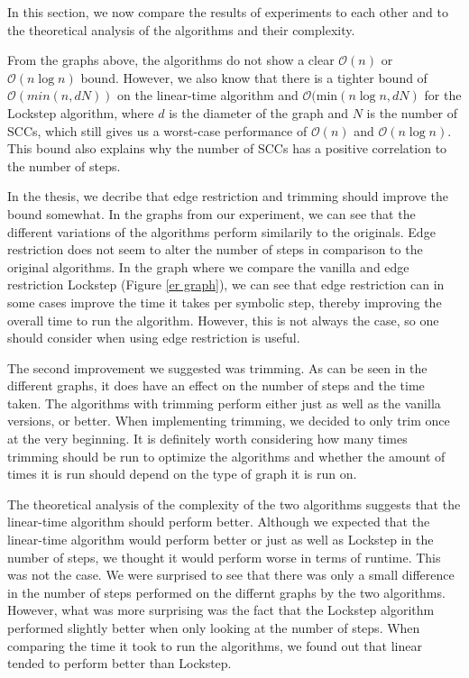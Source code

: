 \documentclass[../master/master.tex]{subfiles}
\begin{document}
In this section, we now compare the results of experiments to each other and to the theoretical analysis of the algorithms and their complexity.

From the graphs above, the algorithms do not show a clear $\mathcal{O}(n)$ or $\mathcal{O}(n\log n)$ bound. However, we also know that there is a tighter bound of $\mathcal{O}(min(n, dN))$ on the linear-time algorithm and $\mathcal{O}(\text{min}(n\log n, dN)$ for the Lockstep algorithm, where $d$ is the diameter of the graph and $N$ is the number of SCCs, which still gives us a worst-case performance of $\mathcal{O}(n)$ and $\mathcal{O}(n\log n)$. This bound also explains why the number of SCCs has a positive correlation to the number of steps.

In the thesis, we decribe that edge restriction and trimming should improve the bound somewhat. In the graphs from our experiment, we can see that the different variations of the algorithms perform similarily to the originals. Edge restriction does not seem to alter the number of steps in comparison to the original algorithms. In the graph where we compare the vanilla and edge restriction Lockstep (Figure \ref{er graph}), we can see that edge restriction can in some cases improve the time it takes per symbolic step, thereby improving the overall time to run the algorithm. However, this is not always the case, so one should consider when using edge restriction is useful.

The second improvement we suggested was trimming. As can be seen in the different graphs, it does have an effect on the number of steps and the time taken. The algorithms with trimming perform either just as well as the vanilla versions, or better. When implementing trimming, we decided to only trim once at the very beginning. It is definitely worth considering how many times trimming should be run to optimize the algorithms and whether the amount of times it is run should depend on the type of graph it is run on.

The theoretical analysis of the complexity of the two algorithms suggests that the linear-time algorithm should perform better.  Although we expected that the linear-time algorithm would perform better or just as well as Lockstep in the number of steps, we thought it would perform worse in terms of runtime. This was not the case. We were surprised to see that there was only a small difference in the number of steps performed on the differnt graphs by the two algorithms. However, what was more surprising was the fact that the Lockstep algorithm performed slightly better when only looking at the number of steps. When comparing the time it took to run the algorithms, we found out that linear tended to perform better than Lockstep.
\end{document}
